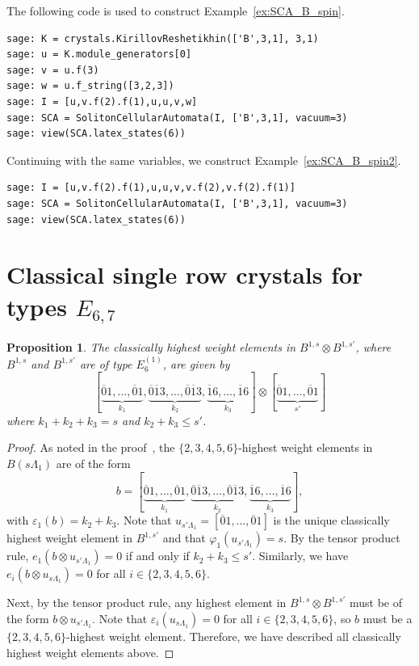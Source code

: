 \documentclass[reqno]{amsart}
\newcommand{\bze}{\overline{0}}
\newcommand{\bon}{\overline{1}}
\theoremstyle{plain}
\newtheorem{prop}[thm]{Proposition}
\theoremstyle{definition}
\numberwithin{equation}{section}
\begin{document}
The following code is used to construct Example~\ref{ex:SCA_B_spin}.

\begin{lstlisting}
sage: K = crystals.KirillovReshetikhin(['B',3,1], 3,1)
sage: u = K.module_generators[0]
sage: v = u.f(3)
sage: w = u.f_string([3,2,3])
sage: I = [u,v.f(2).f(1),u,u,v,w]
sage: SCA = SolitonCellularAutomata(I, ['B',3,1], vacuum=3)
sage: view(SCA.latex_states(6))
\end{lstlisting}

Continuing with the same variables, we construct Example~\ref{ex:SCA_B_spin2}.

\begin{lstlisting}
sage: I = [u,v.f(2).f(1),u,u,v,v.f(2),v.f(2).f(1)]
sage: SCA = SolitonCellularAutomata(I, ['B',3,1], vacuum=3)
sage: view(SCA.latex_states(6))
\end{lstlisting}



\section{Classical single row crystals for types $E_{6,7}$}
\label{sec:classical}

\begin{prop}
The classically highest weight elements in $B^{1,s} \otimes B^{1,s'}$, where $B^{1,s}$ and $B^{1,s'}$ are of type $E^{(1)}_6$, are given by
\[
[\underbrace{\bze1, \dotsc, \bze1}_{k_1}, \underbrace{\bze\bon3, \dotsc, \bze\bon3}_{k_2}, \underbrace{\bon6, \dotsc, \bon6}_{k_3}] \otimes [\underbrace{\bze1, \dotsc, \bze1}_{s'}]
\]
where $k_1 + k_2 + k_3 = s$ and $k_2 + k_3 \leq s'$.
\end{prop}

\begin{proof}
As noted in the proof~\cite[Lemma~3.1]{JS10}, the $\{2,3,4,5,6\}$-highest weight elements in $B(s\Lambda_1)$ are of the form
\[
b = [\underbrace{\bze1, \dotsc, \bze1}_{k_1}, \underbrace{\bze\bon3, \dotsc, \bze\bon3}_{k_2}, \underbrace{\bon6, \dotsc, \bon6}_{k_3}],
\]
with $\varepsilon_1(b) = k_2 + k_3$.
Note that $u_{s'\Lambda_1} = [\bze1, \dotsc, \bze1]$ is the unique classically highest weight element in $B^{1,s'}$ and that $\varphi_1(u_{s'\Lambda_1}) = s$.
By the tensor product rule, $e_1(b\otimes u_{s'\Lambda_1}) = 0$ if and only if $k_2+k_3 \leq s'$.
Similarly, we have $e_i(b\otimes u_{s\Lambda_1}) = 0$ for all $i \in \{2,3,4,5,6\}$.

Next, by the tensor product rule, any highest element in $B^{1,s} \otimes B^{1,s'}$ must be of the form $b \otimes u_{s'\Lambda_1}$.
Note that $\varepsilon_i(u_{s\Lambda_1}) = 0$ for all $i \in \{2,3,4,5,6\}$, so $b$ must be a $\{2,3,4,5,6\}$-highest weight element.
Therefore, we have described all classically highest weight elements above.
\end{proof}
\end{document}
